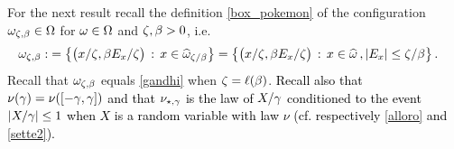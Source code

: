 \documentclass[12pt,a4paper,reqno]{amsart}
\let\O=\Omega \let\P=\Pi   \let\Ps=\Psi \let\Si=\Sigma \let\X=\Xi
\newcommand{\rosso}{\textcolor{black}} %
\begin{document}
For the next result recall  the definition \eqref{box_pokemon}  of the configuration $\o _{\z,\b}\in\O$     for $\o \in \O$  and $\zeta,\beta>0$, i.e. 
\begin{equation*}
\begin{split}
 \omega_{\zeta,\beta}:& =\big\{ \big ( x / \zeta, \beta E_x/\zeta \big) \,: \,  x\in \widehat{\omega}_{\zeta/\beta} \big \}=\big\{ \big ( x/\zeta, \beta E_x/\zeta\big) \,: \, x\in\widehat {\omega}  \,, |E_x| \leq \zeta /\beta \big\} \,.
\end{split}
\end{equation*}
 Recall that $\omega_{\zeta, \beta}$ equals   \eqref{gandhi} 
when $\zeta=\ell(\beta)$. \rosso{Recall also that $\nu(\gamma)=\nu([-\gamma,\gamma])$ and that  $\nu_{\star,\gamma}$ is the law of  $X/\gamma$ conditioned to the event $|X/\gamma|\leq 1$ when $X$ is a random variable with law $\nu$ (cf. respectively \eqref{alloro} and \eqref{sette2}).}
\end{document}
